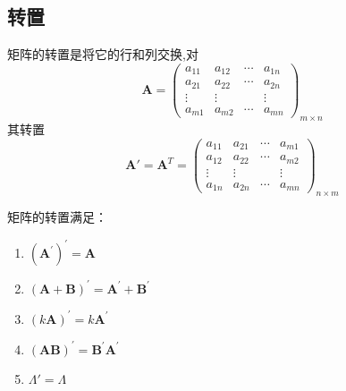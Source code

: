 \subsection{转置}
\begin{formal}
\begin{definition}[转置]
    矩阵的转置是将它的行和列交换,对\[
\displaystyle
     \bm{A} = \begin{pmatrix}
        a_{11} & a_{12} & \cdots & a_{1n}\\
        a_{21} & a_{22} & \cdots & a_{2n}\\
        \vdots & \vdots & & \vdots\\
        a_{m1} & a_{m2} & \cdots & a_{mn}
    \end{pmatrix}_{m \times n}
\]
其转置
\[
    \bm{A}' =
    \bm{A}^{T} = \begin{pmatrix}
        a_{11} & a_{21} & \cdots & a_{m1}\\
        a_{12} & a_{22} & \cdots & a_{m2}\\
        \vdots & \vdots & & \vdots\\
        a_{1n} & a_{2n} & \cdots & a_{mn}
    \end{pmatrix}_{n\times m}
\]
\end{definition}
\end{formal}
\begin{formal}
\begin{proposition}[转置的性质]\label{prop:转置的性质}矩阵的转置满足：

    \begin{enumerate}[label=\textup{(\arabic*)}]
    \item$\left(\bm{A}^{\prime}\right)^{\prime} = \bm{A}$
    \item$\left(\bm{A}+\bm{B}\right)^{\prime} = \bm{A}^{\prime} + \bm{B}^{\prime}$
    \item $\left(k\bm{A}\right)^{\prime} = k\bm{A}^{\prime}$
    \item 
    $\left(\bm{A}\bm{B}\right)^{\prime} = \bm{B}^{\prime}\bm{A}^{\prime}$
    \item $
    \bm{\varLambda} '= 
    \bm{\varLambda} $ 
\end{enumerate}
\end{proposition}
\end{formal}
